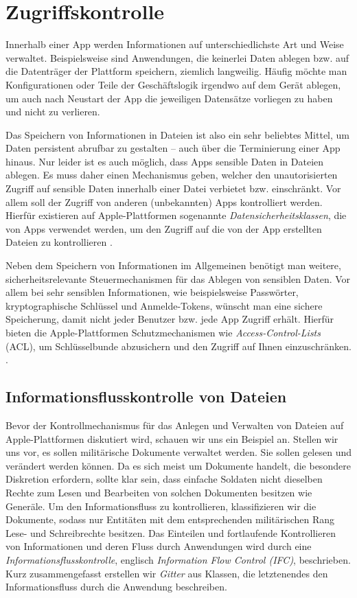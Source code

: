 \section{Zugriffskontrolle}
Innerhalb einer App werden Informationen auf unterschiedlichste Art und Weise
verwaltet. Beispielsweise sind Anwendungen, die keinerlei Daten ablegen bzw. auf
die Datenträger der Plattform speichern, ziemlich langweilig. Häufig möchte man
Konfigurationen oder Teile der Geschäftslogik irgendwo auf dem Gerät ablegen, um
auch nach Neustart der App die jeweiligen Datensätze vorliegen zu haben und
nicht zu verlieren.

Das Speichern von Informationen in Dateien ist also ein sehr beliebtes Mittel,
um Daten persistent abrufbar zu gestalten -- auch über die Terminierung einer
App hinaus. Nur leider ist es auch möglich, dass Apps sensible Daten in Dateien
ablegen.  Es muss daher einen Mechanismus geben, welcher den unautorisierten
Zugriff auf sensible Daten innerhalb einer Datei verbietet bzw.  einschränkt.
Vor allem soll der Zugriff von anderen (unbekannten) Apps kontrolliert werden.
Hierfür existieren auf Apple-Plattformen sogenannte
\textit{Datensicherheitsklassen}, die von Apps verwendet werden, um den Zugriff
auf die von der App erstellten Dateien zu kontrollieren \cite[S. 50]{apple2020}.

Neben dem Speichern von Informationen im Allgemeinen benötigt man weitere,
sicherheitsrelevante Steuermechanismen für das Ablegen von sensiblen Daten. Vor
allem bei sehr sensiblen Informationen, wie beispielsweise Pass\-wör\-ter,
kryptographische Schlüssel und Anmelde-Tokens, wünscht man eine sichere
Speicherung, damit nicht jeder Benutzer bzw. jede App Zugriff erhält. Hierfür
bieten die Apple-Plattformen Schutzmechanismen wie \textit{Access-Control-Lists}
(ACL), um Schlüsselbunde abzusichern und den Zugriff auf Ihnen einzuschränken.
\cite[S. 55]{apple2020}.

\subsection{Informationsflusskontrolle von Dateien}
Bevor der Kontrollmechanismus für das Anlegen und Verwalten von Dateien auf
Apple-Plattformen diskutiert wird, schauen wir uns ein Beispiel an. Stellen wir
uns vor, es sollen militärische Dokumente verwaltet werden. Sie sollen gelesen
und verändert werden können. Da es sich meist um Dokumente handelt, die
besondere Diskretion erfordern, sollte klar sein, dass einfache Soldaten nicht
dieselben Rechte zum Lesen und Bearbeiten von solchen Dokumenten besitzen wie
Generäle. Um den Informationsfluss zu kontrollieren, klassifizieren wir die
Dokumente, sodass nur Entitäten mit dem entsprechenden militärischen Rang Lese-
und Schreibrechte besitzen. Das Einteilen und fortlaufende Kontrollieren von
Informationen und deren Fluss durch Anwendungen wird durch eine
\textit{Informationsflusskontrolle}, englisch \textit{Information Flow Control
(IFC)}, beschrieben. Kurz zusammengefasst erstellen wir \textit{Gitter} aus
Klassen, die letztenendes den Informationsfluss durch die Anwendung beschreiben.

